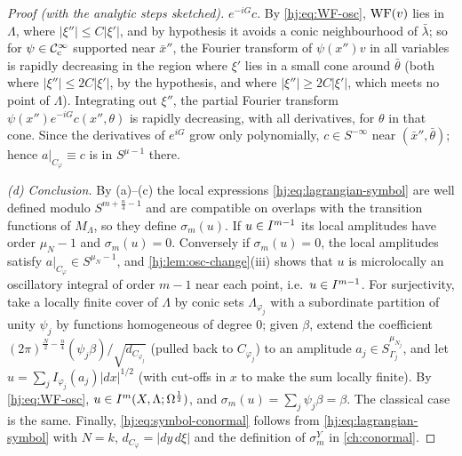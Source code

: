 \begin{proof}[Proof (with the analytic steps sketched)]
  $e^{-iG}c$.  By \eqref{hj:eq:WF-osc}, $\operatorname{WF}(v)$ lies in $\Lambda$, where
  $|\xi''|\le C|\xi'|$, and by hypothesis it avoids a conic neighbourhood of
  $\bar\lambda$; so for $\psi\in\mathcal{C}^\infty_{\mathrm{c}}$ supported near $\bar x''$, the Fourier
  transform of $\psi(x'')v$ in all variables is rapidly decreasing in the
  region where $\xi'$ lies in a small cone around $\bar\theta$ (both where
  $|\xi''|\le2C|\xi'|$, by the hypothesis, and where $|\xi''|\ge2C|\xi'|$, which
  meets no point of $\Lambda$).  Integrating out $\xi''$, the partial Fourier
  transform $\psi(x'')e^{-iG}c(x'',\theta)$ is rapidly decreasing, with all
  derivatives, for $\theta$ in that cone.  Since the derivatives of $e^{iG}$ grow
  only polynomially, $c\in S^{-\infty}$ near $(\bar x'',\bar\theta)$; hence
  $a|_{C_\varphi}\equiv c$ is in $S^{\mu-1}$ there.

  \emph{(d) Conclusion.}  By (a)--(c) the local expressions
  \eqref{hj:eq:lagrangian-symbol} are well defined modulo $S^{m+\frac n4-1}$ and
  are compatible on overlaps with the transition functions of $M_\Lambda$, so
  they define $\sigma_m(u)$.  If $u\in I^{m-1}$ its local amplitudes have order
  $\mu_N-1$ and $\sigma_m(u)=0$.  Conversely if $\sigma_m(u)=0$, the local
  amplitudes satisfy $a|_{C_\varphi}\in S^{\mu_N-1}$, and
  \cref{hj:lem:osc-change}(iii) shows that $u$ is microlocally an oscillatory
  integral of order $m-1$ near each point, i.e.\ $u\in I^{m-1}$.  For
  surjectivity, take a locally finite cover of $\Lambda$ by conic sets
  $\Lambda_{\varphi_j}$ with a subordinate partition of unity $\psi_j$ by
  functions homogeneous of degree $0$; given $\beta$, extend the coefficient
  $(2\pi)^{\frac N2-\frac n4}(\psi_j\beta)/\sqrt{d_{C_{\varphi_j}}}$ (pulled back
  to $C_{\varphi_j}$) to an amplitude $a_j\in S^{\mu_{N_j}}_{\Gamma_j}$, and let
  $u=\sum_jI_{\varphi_j}(a_j)|dx|^{1/2}$ (with cut-offs in $x$ to make the sum
  locally finite).  By \eqref{hj:eq:WF-osc}, $u\in I^{m}(X,\Lambda;\Omega^{\frac12})$, and
  $\sigma_m(u)=\sum_j\psi_j\beta=\beta$.  The classical case is the same.
  Finally, \eqref{hj:eq:symbol-conormal} follows from
  \eqref{hj:eq:lagrangian-symbol} with $N=k$, $d_{C_\varphi}=|dy\,d\xi|$ and the
  definition of $\sigma^Y_m$ in \cref{ch:conormal}.
\end{proof}

